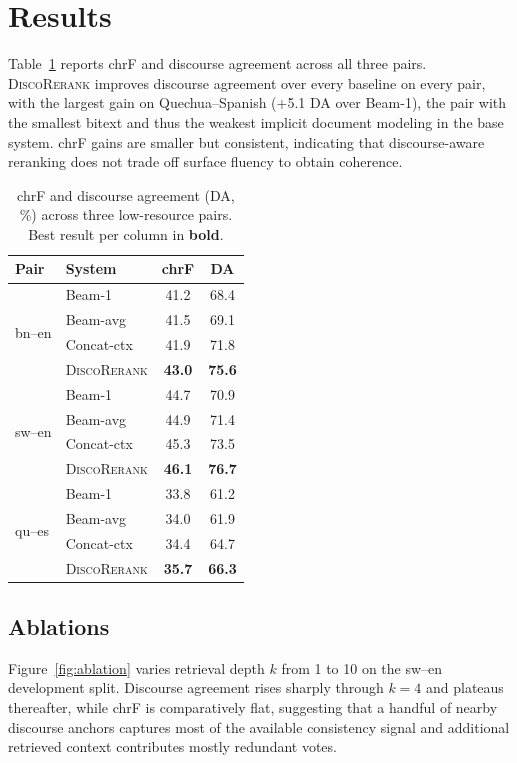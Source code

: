 \section{Results}

Table~\ref{tab:main} reports chrF and discourse agreement across all three
pairs. \textsc{DiscoRerank} improves discourse agreement over every baseline
on every pair, with the largest gain on Quechua--Spanish (+5.1 DA over
Beam-1), the pair with the smallest bitext and thus the weakest implicit
document modeling in the base system. chrF gains are smaller but consistent,
indicating that discourse-aware reranking does not trade off surface fluency
to obtain coherence.

\begin{table}[t]
\centering
\small
\caption{chrF and discourse agreement (DA, \%) across three low-resource
pairs. Best result per column in \textbf{bold}.}
\label{tab:main}
\begin{tabular}{@{}l l cc@{}}
\toprule
\textbf{Pair} & \textbf{System} & \textbf{chrF} & \textbf{DA} \\
\midrule
\multirow{4}{*}{bn--en}
 & Beam-1        & 41.2 & 68.4 \\
 & Beam-avg      & 41.5 & 69.1 \\
 & Concat-ctx    & 41.9 & 71.8 \\
 & \textsc{DiscoRerank} & \textbf{43.0} & \textbf{75.6} \\
\midrule
\multirow{4}{*}{sw--en}
 & Beam-1        & 44.7 & 70.9 \\
 & Beam-avg      & 44.9 & 71.4 \\
 & Concat-ctx    & 45.3 & 73.5 \\
 & \textsc{DiscoRerank} & \textbf{46.1} & \textbf{76.7} \\
\midrule
\multirow{4}{*}{qu--es}
 & Beam-1        & 33.8 & 61.2 \\
 & Beam-avg      & 34.0 & 61.9 \\
 & Concat-ctx    & 34.4 & 64.7 \\
 & \textsc{DiscoRerank} & \textbf{35.7} & \textbf{66.3} \\
\bottomrule
\end{tabular}
\end{table}

\subsection{Ablations}
Figure~\ref{fig:ablation} varies retrieval depth $k$ from 1 to 10 on the
sw--en development split. Discourse agreement rises sharply through $k=4$ and
plateaus thereafter, while chrF is comparatively flat, suggesting that a
handful of nearby discourse anchors captures most of the available
consistency signal and additional retrieved context contributes mostly
redundant votes.


